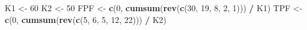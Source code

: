 \documentclass[
]{book}
\newenvironment{Shaded}{\begin{snugshade}}{\end{snugshade}}
\newcommand{\DecValTok}[1]{\textcolor[rgb]{0.00,0.00,0.81}{#1}}
\newcommand{\KeywordTok}[1]{\textcolor[rgb]{0.13,0.29,0.53}{\textbf{#1}}}
\newcommand{\NormalTok}[1]{#1}
\newcommand{\OperatorTok}[1]{\textcolor[rgb]{0.81,0.36,0.00}{\textbf{#1}}}
\newcommand{\StringTok}[1]{\textcolor[rgb]{0.31,0.60,0.02}{#1}}
\begin{document}
\begin{Shaded}
\begin{Highlighting}[]
\NormalTok{K1 \textless{}{-}}\StringTok{ }\DecValTok{60}
\NormalTok{K2 \textless{}{-}}\StringTok{ }\DecValTok{50}
\NormalTok{FPF \textless{}{-}}\StringTok{ }\KeywordTok{c}\NormalTok{(}\DecValTok{0}\NormalTok{, }\KeywordTok{cumsum}\NormalTok{(}\KeywordTok{rev}\NormalTok{(}\KeywordTok{c}\NormalTok{(}\DecValTok{30}\NormalTok{, }\DecValTok{19}\NormalTok{, }\DecValTok{8}\NormalTok{, }\DecValTok{2}\NormalTok{, }\DecValTok{1}\NormalTok{))) }\OperatorTok{/}\StringTok{ }\NormalTok{K1)}
\NormalTok{TPF \textless{}{-}}\StringTok{ }\KeywordTok{c}\NormalTok{(}\DecValTok{0}\NormalTok{, }\KeywordTok{cumsum}\NormalTok{(}\KeywordTok{rev}\NormalTok{(}\KeywordTok{c}\NormalTok{(}\DecValTok{5}\NormalTok{, }\DecValTok{6}\NormalTok{, }\DecValTok{5}\NormalTok{, }\DecValTok{12}\NormalTok{, }\DecValTok{22}\NormalTok{))) }\OperatorTok{/}\StringTok{ }\NormalTok{K2)}


\end{Highlighting}
\end{Shaded}
\end{document}
